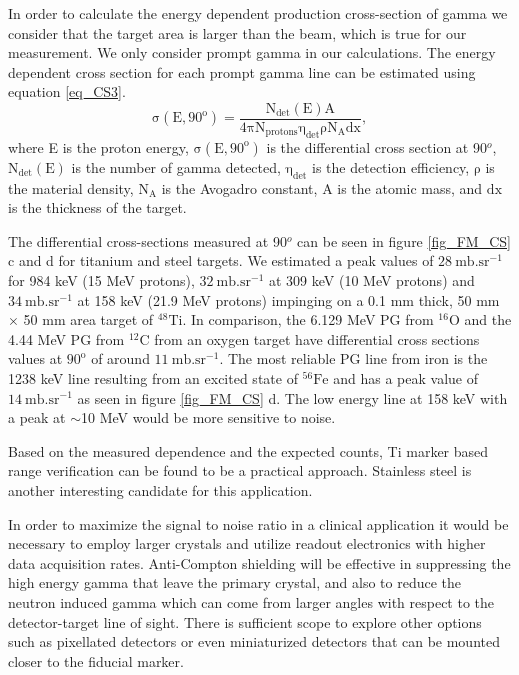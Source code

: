 \documentclass[11pt,a4paper]{article}
\begin{document}
In order to calculate the energy dependent production cross-section of gamma we consider that the target area is larger than the beam, which is true for our measurement. 
We only consider prompt gamma in our calculations. The energy dependent cross section for each prompt gamma line can be estimated using equation \ref{eq_CS3}.
\begin{equation}\label{eq_CS3}
\mathrm{\sigma(E,90^o) = \frac{N_{det}(E)  A}{4\pi N_{protons} \eta_{det}  \rho N_{A}  dx},   }
\end{equation}
where E is the proton energy, $\mathrm{\sigma(E,90^o)}$ is the differential cross section at 90$^o$,  $\mathrm{N_{det}(E)}$ is the number of gamma detected, $\mathrm{\eta_{det} }$ is the detection efficiency, $\mathrm{\rho}$ is the material density, $\mathrm{N_{A}}$ is the Avogadro constant, $\mathrm{A}$ is the atomic mass, and $\mathrm{dx}$ is the thickness of the target.

The differential cross-sections measured at 90$^o$ can be seen in figure \ref{fig_FM_CS} c and d for titanium and steel targets. We estimated a peak values of $\mathrm{28\ mb.sr^{-1}}$  for 984 keV (15 MeV protons), $\mathrm{32\ mb.sr^{-1}}$  at 309 keV (10 MeV protons) and $\mathrm{34\ mb.sr^{-1}}$  at 158 keV (21.9 MeV protons)  impinging on a 0.1 mm thick, 50 mm $\times$ 50 mm area target of  $\mathrm{^{48}Ti}$.  In comparison, the 6.129 MeV PG from $\mathrm{^{16}O}$  and the 4.44 MeV PG from $\mathrm{^{12}C}$ from an oxygen target have differential cross sections values at $\mathrm{90^o}$ of around $\mathrm{11\ mb.sr^{-1}}$. The most reliable PG line from iron is the 1238 keV line resulting from an excited state of $\mathrm{^{56}Fe}$ and has a peak value of $\mathrm{14\ mb.sr^{-1}}$ as seen in figure \ref{fig_FM_CS} d. The low energy line at 158 keV with a peak at $\sim$10 MeV would be more sensitive to noise. 


Based on the measured dependence and the expected counts, Ti marker based range verification can be found to be a practical approach. Stainless steel is another interesting candidate for this application.

In order to maximize the signal to noise ratio in a clinical application it would be necessary to employ larger crystals and utilize readout electronics with higher data acquisition rates. Anti-Compton shielding will be effective in suppressing the high energy gamma that leave the primary crystal, and also to reduce the neutron induced gamma which can come from larger angles with respect to the detector-target line of sight. There is sufficient scope to explore other options such as pixellated detectors or even miniaturized detectors that can be mounted closer to the fiducial marker.
 
\end{document}
